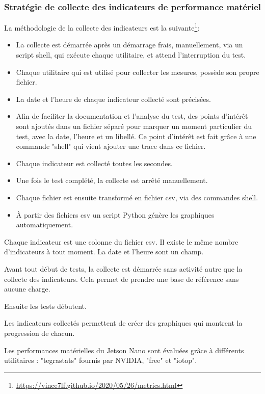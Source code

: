 \subsubsection{Stratégie de collecte des indicateurs de performance matériel}
\par La méthodologie de la collecte des indicateurs est la suivante\footnote{\url{https://vince7lf.github.io/2020/05/26/metrics.html}}: 
\begin{itemize}    
    \item La collecte est démarrée après un démarrage frais, manuellement, via un script shell, qui exécute chaque utilitaire, et attend l'interruption du test. 
    \item Chaque utilitaire qui est utilisé pour collecter les mesures, possède son propre fichier.
    \item La date et l'heure de chaque indicateur collecté sont précisées.
    \item Afin de faciliter la documentation et l'analyse du test, des points d'intérêt sont ajoutés dans un fichier séparé pour marquer un moment particulier du test, avec la date, l'heure et un libellé. Ce point d'intérêt est fait grâce à une commande "shell" qui vient ajouter une trace dans ce fichier.
    \item Chaque indicateur est collecté toutes les secondes.  
    \item Une fois le test complété, la collecte est arrêté manuellement. 
    \item Chaque fichier est ensuite transformé en fichier \acrshort{csv}, via des commandes shell.
    \item À partir des fichiers \acrshort{csv} un script Python génère les graphiques automatiquement. 
\end{itemize}
\par Chaque indicateur est une colonne du fichier \acrshort{csv}. Il existe le même nombre d'indicateurs à tout moment. La date et l'heure sont un champ. 
\par Avant tout début de tests, la collecte est démarrée sans activité autre que la collecte des indicateurs. Cela permet de prendre une base de référence sans aucune charge.
\par Ensuite les tests débutent. 
\par Les indicateurs collectés permettent de créer des graphiques qui montrent la progression de chacun.
\par Les performances matérielles du Jetson Nano sont évaluées grâce à différents utilitaires : "tegrastats" fournis par NVIDIA, "free" et "iotop".
